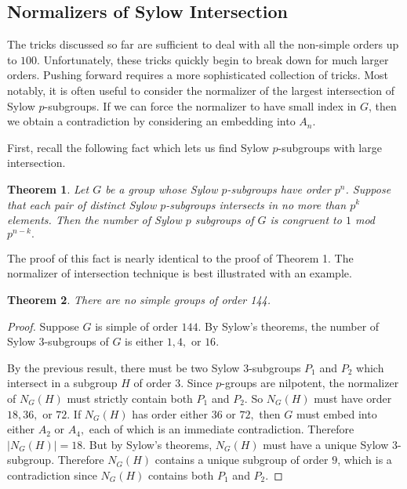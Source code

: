 \documentclass[11pt,
oneside]{article} %
\newtheorem{theorem}{Theorem}
\begin{document}
\subsection{Normalizers of Sylow Intersection}

The tricks discussed so far are sufficient to deal with all the
non-simple orders up to
$100.$ %
Unfortunately, these tricks quickly begin to break down for much
larger orders.  Pushing forward requires a more sophisticated
collection of tricks.  Most notably, it is often useful to consider
the normalizer of the largest intersection of Sylow $p$-subgroups.  If
we can force the normalizer to have small index in $G$, then we obtain
a contradiction by considering an embedding into $A_n.$

First, recall the following fact which lets us find Sylow $p$-subgroups with large intersection.
\begin{theorem}
  Let $G$ be a group whose Sylow $p$-subgroups have order
  $p^n$. Suppose that each pair of distinct Sylow $p$-subgroups
  intersects in no more than $p^k$ elements.  Then the number of Sylow
  $p$ subgroups of $G$ is congruent to $1$ mod $p^{n-k}.$
\end{theorem}

The proof of this fact is nearly identical to the proof of Theorem 1.
The normalizer of intersection technique is best illustrated with an
example.

\begin{theorem}
There are no simple groups of order 144.
\end{theorem}
\begin{proof}
  Suppose $G$ is simple of order $144$. By Sylow's theorems, the
  number of Sylow $3$-subgroups of $G$ is either $1,4,$ or $16$.

By the previous result, there must be two Sylow $3$-subgroups $P_1$
and $P_2$ which intersect in a subgroup $H$ of order $3.$ Since
$p$-groups are nilpotent, the normalizer of $N_G(H)$ must strictly
contain both $P_1$ and $P_2$.  So $N_G(H)$ must have order $18, 36, $
or $72$.  If $N_G(H)$ has order either $36$ or $72,$ then $G$ must
embed into either $A_2$ or $A_4,$ each of which is an immediate
contradiction.  Therefore $|N_G(H)| = 18.$ But by Sylow's theorems,
$N_G(H)$ must have a unique Sylow $3$-subgroup.  Therefore $N_G(H)$
contains a unique subgroup of order $9$, which is a contradiction
since $N_G(H)$ contains both $P_1$ and $P_2$.
\end{proof}
\end{document}
